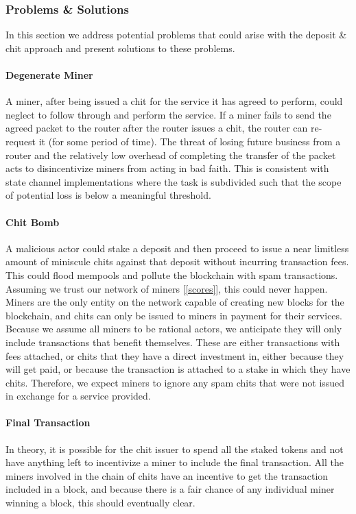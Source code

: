 \documentclass[UTF8, 10pt, nonatbib, nocopyrightspace, reprint]{sigplanconf}
\newcommand{\secref}[1]{[\autoref{#1}]}
\begin{document}
\subsubsection{Problems \& Solutions}

In this section we address potential problems that could arise with the deposit \& chit approach and present solutions to these problems.

\paragraph{Degenerate Miner} A miner, after being issued a chit for the service it has agreed to perform, could neglect to follow through and perform the service. If a miner fails to send the agreed packet to the router after the router issues a chit, the router can re-request it (for some period of time). The threat of losing future business from a router and the relatively low overhead of completing the transfer of the packet acts to disincentivize miners from acting in bad faith. This is consistent with state channel implementations where the task is subdivided such that the scope of potential loss is below a meaningful threshold.

\paragraph{Chit Bomb} A malicious actor could stake a deposit and then proceed to issue a near limitless amount of miniscule chits against that deposit without incurring transaction fees. This could flood mempools and pollute the blockchain with spam transactions. Assuming we trust our network of miners \secref{scores}, this could never happen. Miners are the only entity on the network capable of creating new blocks for the blockchain, and chits can only be issued to miners in payment for their services. Because we assume all miners to be rational actors, we anticipate they will only include transactions that benefit themselves. These are either transactions with fees attached, or chits that they have a direct investment in, either because they will get paid, or because the transaction is attached to a stake in which they have chits. Therefore, we expect miners to ignore any spam chits that were not issued in exchange for a service provided.

\paragraph{Final Transaction}
In theory, it is possible for the chit issuer to spend all the staked tokens and not have anything left to incentivize a miner to include the final transaction. All the miners involved in the chain of chits have an incentive to get the transaction included in a block, and because there is a fair chance of any individual miner winning a block, this should eventually clear.
\end{document}
